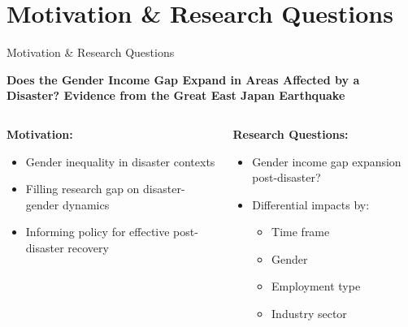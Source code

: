 \documentclass[serif, aspectratio=169]{beamer}
\begin{document}
\section{Motivation \& Research Questions}


\begin{frame}{Motivation \& Research Questions}
    \begin{center}
\vspace{-0.50cm} 
    
        \Large\textbf{Does the Gender Income Gap Expand in Areas Affected by a Disaster? Evidence from the Great East Japan Earthquake}
        \vspace{-0.3cm}
    \end{center}
    
    \vspace{0.7cm}
    
    \begin{columns}[T]
        \begin{column}{0.5\textwidth}
            \textbf{Motivation:}
            \begin{itemize}\small
                \item Gender inequality in disaster contexts
                \item Filling research gap on disaster-gender dynamics
                \item Informing policy for effective post-disaster recovery
            \end{itemize}
        \end{column}
        
        \begin{column}{0.5\textwidth}
            \textbf{Research Questions:}
            \begin{itemize}\small
                \item Gender income gap expansion post-disaster?
                \item Differential impacts by:
                    \begin{itemize}\footnotesize
                        \item Time frame
                        \item Gender
                        \item Employment type
                        \item Industry sector
                    \end{itemize}
            \end{itemize}
        \end{column}
    \end{columns}
\end{frame}
\end{document}
